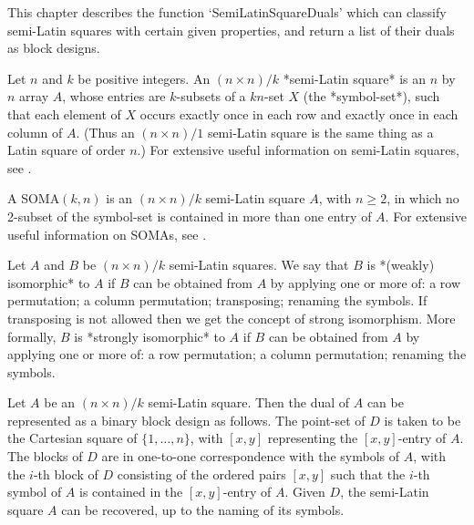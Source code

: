 %
%
%
%
\def\GRAPE{\sf GRAPE}
\def\DESIGN{\sf DESIGN}
\def\nauty{\it nauty}
\def\Aut{{\rm Aut}\,} 


This chapter describes the function `SemiLatinSquareDuals' which can
classify semi-Latin squares with certain given properties, and return
a list of their duals as block designs.


Let $n$ and $k$ be positive integers. An $(n\times n)/k$ *semi-Latin
square*
is an $n$ by $n$ array $A$, whose
entries are $k$-subsets of a $kn$-set $X$ (the *symbol-set*), such that
each element of $X$ occurs exactly once in each row and exactly once in
each column of $A$. (Thus an $(n\times n)/1$ semi-Latin square is the same
thing as a Latin square of order $n$.) For extensive useful information on
semi-Latin squares, see 
.

A SOMA$(k,n)$
is an $(n\times n)/k$ semi-Latin square $A$,
with $n\ge2$, in which no 2-subset of the symbol-set is contained in
more than one entry of $A$.  For extensive useful information on SOMAs,
see .

Let $A$ and $B$ be $(n\times n)/k$ semi-Latin squares.  We say that
$B$ is *(weakly) isomorphic* to $A$ if $B$ can be obtained from $A$
by applying one or more of: a row permutation; a column permutation;
transposing; renaming the symbols. If transposing is not allowed then we
get the concept of strong isomorphism. More formally, $B$ is *strongly
isomorphic* to $A$ if $B$ can be obtained from $A$ by applying one or
more of: a row permutation; a column permutation; renaming the symbols.

Let $A$ be an $(n\times n)/k$  semi-Latin square.  Then the dual of $A$
can be represented as a binary block design as follows. The point-set of
$D$ is taken to be the Cartesian square of $\{1,\ldots,n\}$, with $[x,y]$
representing the $[x,y]$-entry of $A$. The blocks of $D$ are in one-to-one
correspondence with the symbols of $A$, with the $i$-th block of $D$
consisting of the ordered pairs $[x,y]$ such that the $i$-th symbol of
$A$ is contained in the $[x,y]$-entry of $A$. Given $D$, the semi-Latin
square $A$ can be recovered, up to the naming of its symbols.


